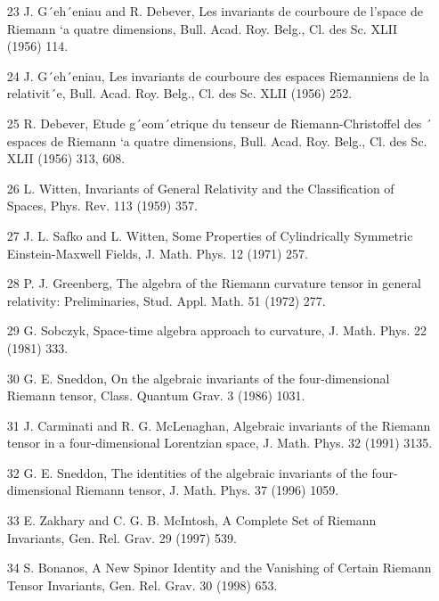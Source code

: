 \documentclass{article}
\begin{document}
\begin{itemize}
\item 
[23] J. G´eh´eniau and R. Debever, Les invariants de courboure de l'space de Riemann `a quatre dimensions, Bull. Acad. Roy. Belg., Cl. des Sc. XLII (1956) 114.

\item 
[24] J. G´eh´eniau, Les invariants de courboure des espaces Riemanniens de la relativit´e, Bull. Acad. Roy. Belg., Cl. des Sc. XLII (1956) 252.

\item 
[25] R. Debever, Etude g´eom´etrique du tenseur de Riemann-Christoffel des ´ espaces de Riemann `a quatre dimensions, Bull. Acad. Roy. Belg., Cl. des Sc. XLII (1956) 313, 608.

\item 
[26] L. Witten, Invariants of General Relativity and the Classification of Spaces, Phys. Rev. 113 (1959) 357.

\item 
[27] J. L. Safko and L. Witten, Some Properties of Cylindrically Symmetric Einstein-Maxwell Fields, J. Math. Phys. 12 (1971) 257.

\item 
[28] P. J. Greenberg, The algebra of the Riemann curvature tensor in general relativity: Preliminaries, Stud. Appl. Math. 51 (1972) 277.

\item 
[29] G. Sobczyk, Space-time algebra approach to curvature, J. Math. Phys. 22 (1981) 333.

\item 
[30] G. E. Sneddon, On the algebraic invariants of the four-dimensional Riemann tensor, Class. Quantum Grav. 3 (1986) 1031.

\item 
[31] J. Carminati and R. G. McLenaghan, Algebraic invariants of the Riemann tensor in a four-dimensional Lorentzian space, J. Math. Phys. 32 (1991) 3135.

\item 
[32] G. E. Sneddon, The identities of the algebraic invariants of the four-dimensional Riemann tensor, J. Math. Phys. 37 (1996) 1059.

\item 
[33] E. Zakhary and C. G. B. McIntosh, A Complete Set of Riemann Invariants, Gen. Rel. Grav. 29 (1997) 539.

\item 
[34] S. Bonanos, A New Spinor Identity and the Vanishing of Certain Riemann Tensor Invariants, Gen. Rel. Grav. 30 (1998) 653.


\end{itemize}
\end{document}
